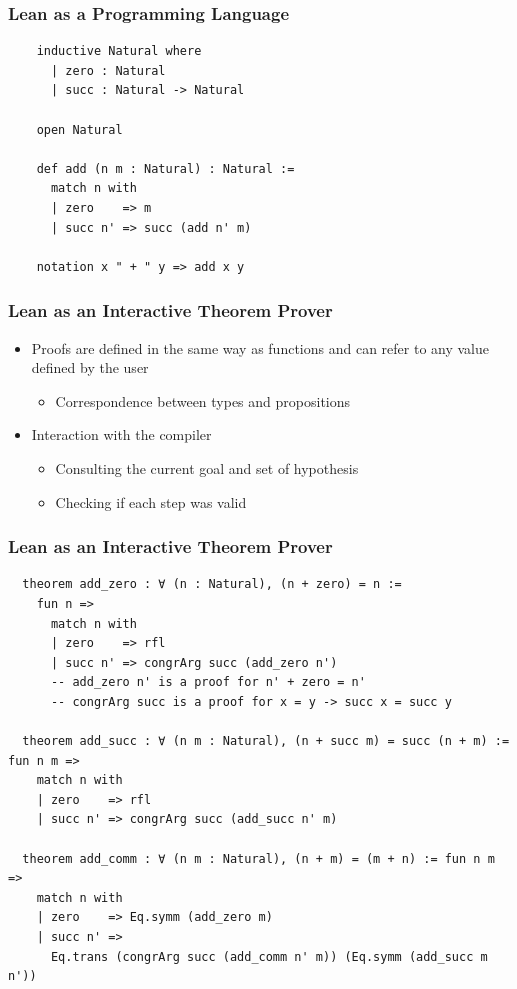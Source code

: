 \documentclass[usepdftitle=false,aspectratio=169,usenames,dvipsnames]{beamer}
\newcommand\vitem{\vfill\item}
\begin{document}
\begin{frame}[fragile]
  \frametitle{Lean as a Programming Language}
  \begin{verbatim}
    inductive Natural where
      | zero : Natural
      | succ : Natural -> Natural

    open Natural

    def add (n m : Natural) : Natural :=
      match n with
      | zero    => m
      | succ n' => succ (add n' m)

    notation x " + " y => add x y
  \end{verbatim}
\end{frame}

\begin{frame}
  \frametitle{Lean as an Interactive Theorem Prover}
  \begin{itemize}
    \item Proofs are defined in the same way as functions and can refer to any value defined by the user
    \begin{itemize}
      \item Correspondence between types and propositions
    \end{itemize}
    \vitem Interaction with the compiler
    \begin{itemize}
      \item Consulting the current goal and set of hypothesis
      \item Checking if each step was valid
    \end{itemize}
  \end{itemize}
\end{frame}

\begin{frame}[fragile]
  \frametitle{Lean as an Interactive Theorem Prover}
  \begin{verbatim}
  theorem add_zero : ∀ (n : Natural), (n + zero) = n :=
    fun n =>
      match n with
      | zero    => rfl
      | succ n' => congrArg succ (add_zero n')
      -- add_zero n' is a proof for n' + zero = n'
      -- congrArg succ is a proof for x = y -> succ x = succ y

  theorem add_succ : ∀ (n m : Natural), (n + succ m) = succ (n + m) := fun n m =>
    match n with
    | zero    => rfl
    | succ n' => congrArg succ (add_succ n' m)

  theorem add_comm : ∀ (n m : Natural), (n + m) = (m + n) := fun n m =>
    match n with
    | zero    => Eq.symm (add_zero m)
    | succ n' =>
      Eq.trans (congrArg succ (add_comm n' m)) (Eq.symm (add_succ m n'))
  \end{verbatim}
\end{frame}
\end{document}
